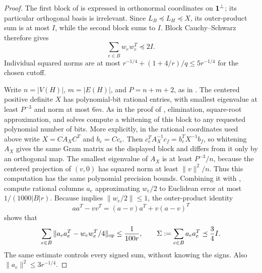 \begin{proof}
The first block of  is expressed in orthonormal
coordinates on $\mathbf 1^\perp$; its particular orthogonal basis is
irrelevant. Since $L_B\preceq L_H\preceq X$, its outer-product sum is
at most $I$, while the second block sums to $I$. Block
Cauchy--Schwarz therefore gives
\begin{equation}
                 \sum_{e\in B}w_ew_e^T\preceq2I.
 \label{eq:ta-subisotropic}
\end{equation}
Individual squared norms are at most
$r^{-1/4}+(1+4/r)/q\le5r^{-1/4}$ for the chosen cutoff.

Write $n=|V(H)|$, $m=|E(H)|$, and $P=n+m+2$, as in
. The centered positive definite $X$ has polynomial-bit rational entries,
with smallest eigenvalue at least $P^{-3}$ and norm at most $6m$.
As in the proof of , elimination, square-root
approximation, and solves compute a whitening of this block to any
requested polynomial number of bits. More explicitly, in the rational
coordinates used above write $X=CA_XC^T$ and $b_e=Cc_e$. Then
$c_e^TA_X^{-1}c_f=b_e^TX^{-1}b_f$, so whitening $A_X$ gives the same
Gram matrix as the displayed block and differs from it only by an
orthogonal map. The smallest eigenvalue of $A_X$ is at least
$P^{-3}/n$, because the centered projection of $(v,0)$ has squared norm
at least $\|v\|^2/n$. Thus this computation has the same polynomial
precision bounds. Combining it with , compute
rational columns $a_e$ approximating $w_e/2$ to Euclidean error at most
$1/(1000|B|r)$. Because  implies
$\|w_e/2\|\le1$, the outer-product identity
\[
 aa^T-vv^T=(a-v)a^T+v(a-v)^T
\]
shows that
\begin{equation}
 \sum_{e\in B}\|a_ea_e^T-w_ew_e^T/4\|_{\mathrm{op}}
       \le\frac1{100r},\qquad
 \Sigma:=\sum_{e\in B}a_ea_e^T\preceq\frac34I.
 \label{eq:ta-approximate-data}
\end{equation}
The same estimate controls every signed sum, without knowing the signs.
Also $\|a_e\|^2\le3r^{-1/4}$.


\end{proof}
